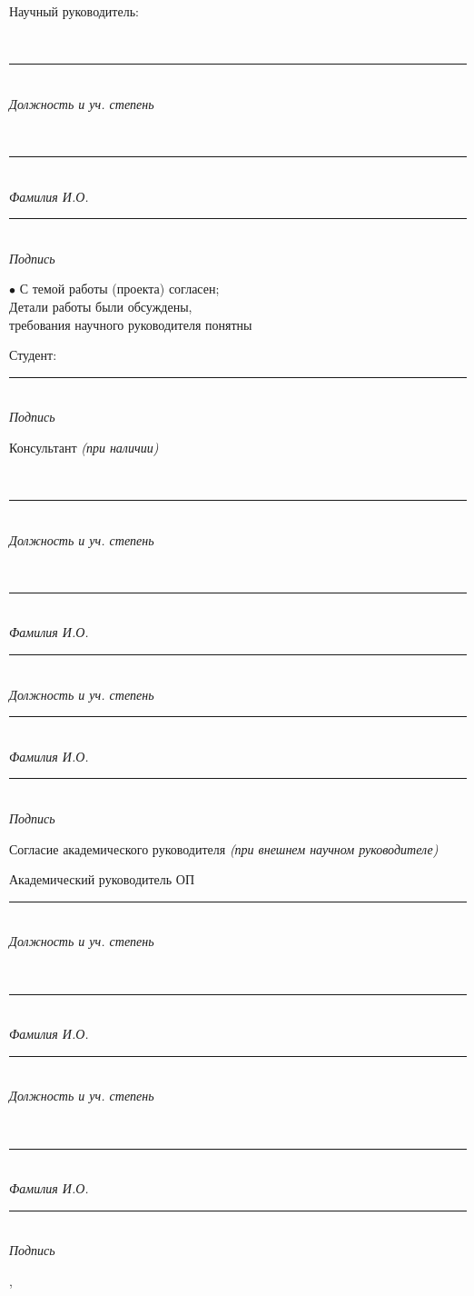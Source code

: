 \documentclass[12pt,a4paper]{article}
\newcommand{\hseSignField}[2]{%
  \begin{minipage}[t]{#1}\centering
    \rule{\linewidth}{0.4pt}\\[-2pt]{\footnotesize\itshape #2}
  \end{minipage}}
\newcommand{\hseFilledField}[3]{%
  \begin{minipage}[t]{#1}\centering
    {\small #2}\\[-4pt]\rule{\linewidth}{0.4pt}\\[-2pt]{\footnotesize\itshape #3}
  \end{minipage}}
\begin{document}
\vspace{0.3cm}
\begin{minipage}[t]{0.27\textwidth}\raggedright Научный руководитель:\end{minipage}%
\hseFilledField{0.3\textwidth}{\hseSupervisorTitle\ifdefempty{\hseSupervisorDegree}{}{, \hseSupervisorDegree}}{Должность и уч. степень}\hfill
\hseFilledField{0.22\textwidth}{\hseSupervisorName}{Фамилия И.О.}\hfill
\hseSignField{0.15\textwidth}{Подпись}

\vspace{0.5cm}
\begin{minipage}[t]{0.55\textwidth}
$\bullet$ С темой работы (проекта) согласен;\\
Детали работы были обсуждены,\\
требования научного руководителя понятны
\end{minipage}\hfill
\begin{minipage}[t]{0.4\textwidth}
\vspace{0.5cm}
Студент: \hfill \hseSignField{0.5\textwidth}{Подпись}
\end{minipage}

\vspace{0.5cm}
\begin{minipage}[t]{0.27\textwidth}\raggedright Консультант {\itshape(при наличии)}\end{minipage}%
\ifhseHasCoSupervisor
\hseFilledField{0.3\textwidth}{\hseCoSupervisorTitle\ifdefempty{\hseCoSupervisorDegree}{}{, \hseCoSupervisorDegree}}{Должность и уч. степень}\hfill
\hseFilledField{0.22\textwidth}{\hseCoSupervisorName}{Фамилия И.О.}\hfill
\else
\hseSignField{0.3\textwidth}{Должность и уч. степень}\hfill
\hseSignField{0.22\textwidth}{Фамилия И.О.}\hfill
\fi
\hseSignField{0.15\textwidth}{Подпись}

\vspace{0.5cm}
\begin{minipage}[t]{0.27\textwidth}\raggedright Согласие академического руководителя {\itshape(при внешнем научном руководителе)}\end{minipage}%
\ifhseExternalSupervisor
\hseFilledField{0.3\textwidth}{Академический руководитель ОП}{Должность и уч. степень}\hfill
\hseFilledField{0.22\textwidth}{\hseAcademicSupervisorName}{Фамилия И.О.}\hfill
\else
\hseSignField{0.3\textwidth}{Должность и уч. степень}\hfill
\hseFilledField{0.22\textwidth}{\hseAcademicSupervisorName}{Фамилия И.О.}\hfill
\fi
\hseSignField{0.15\textwidth}{Подпись}

\vfill
\begin{center}\hseCity, \the\year\end{center}
\end{document}
